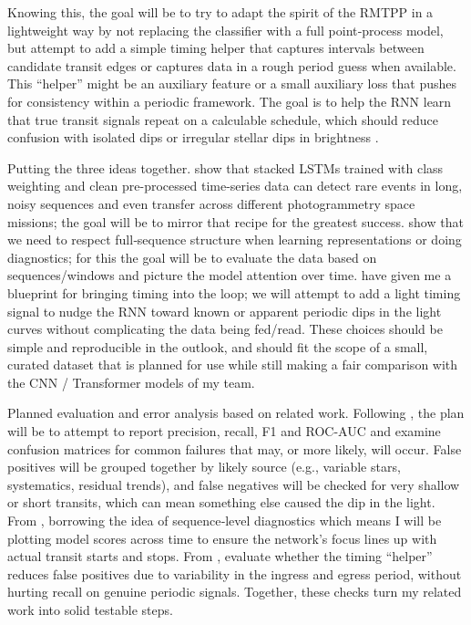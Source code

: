 \documentclass[letterpaper]{article} %
\begin{document}
Knowing this, the goal will be to try to adapt the spirit of the RMTPP in a lightweight way by not replacing the classifier with a full point‑process model, but attempt to add a simple timing helper that captures intervals between candidate transit edges or captures data in a rough period guess when available. This “helper” might be an auxiliary feature or a small auxiliary loss that pushes for consistency within a periodic framework. The goal is to help the RNN learn that true transit signals repeat on a calculable schedule, which should reduce confusion with isolated dips or irregular stellar dips in brightness \cite{Du2016markedtemporalpoint}.

Putting the three ideas together. \cite{Vida2021findingflaresrecurrent} show that stacked LSTMs trained with class weighting and clean pre-processed time-series data can detect rare events in long, noisy sequences and even transfer across different photogrammetry space missions; the goal will be to mirror that recipe for the greatest success. \cite{kugler2016explorativeapproachkepler} show that we need to respect full‑sequence structure when learning representations or doing diagnostics; for this the goal will be to evaluate the data based on sequences/windows and picture the model attention over time. \cite{Du2016markedtemporalpoint} have given me a blueprint for bringing timing into the loop; we will attempt to add a light timing signal to nudge the RNN toward known or apparent periodic dips in the light curves without complicating the data being fed/read. These choices should be simple and reproducible in the outlook, and should fit the scope of a small, curated dataset that is planned for use while still making a fair comparison with the CNN / Transformer models of my team.

Planned evaluation and error analysis based on related work. Following \cite{Vida2021findingflaresrecurrent}, the plan will be to attempt to report precision, recall, F1 and ROC-AUC and examine confusion matrices for common failures that may, or more likely, will occur. False positives will be grouped together by likely source (e.g., variable stars, systematics, residual trends), and false negatives will be checked for very shallow or short transits, which can mean something else caused the dip in the light. From \cite{kugler2016explorativeapproachkepler}, borrowing the idea of sequence‑level diagnostics which means I will be plotting model scores across time to ensure the network’s focus lines up with actual transit starts and stops. From \cite{Du2016markedtemporalpoint}, evaluate whether the timing “helper” reduces false positives due to variability in the ingress and egress period, without hurting recall on genuine periodic signals. Together, these checks turn my related work into solid testable steps.
\end{document}
